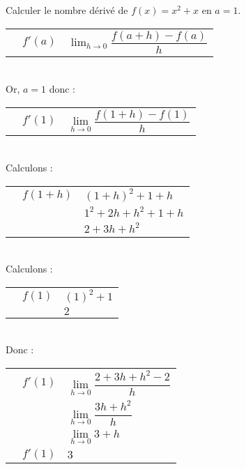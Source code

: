 \documentclass[11pt]{article}
\begin{document}
\begin{correction}[Exercice 1.1]
Calculer le nombre dérivé de $f(x)=x^2+x$ en $a=1$.\\
   \begin{tabular}{p{0.3cm}l!{=}l}
      &  $f'(a)$ & $\lim_{h\to0}\dfrac{f(a+h)-f(a)}{h}$ \\
   \end{tabular} \\

Or, $a=1$ donc :

   \begin{tabular}{p{0.3cm}l!{=}l}
      &  $f'(1)$ & $\lim\limits_{h\to0}\dfrac{f(1+h)-f(1)}{h}$ \\
   \end{tabular} \\

Calculons :\\
\begin{tabular}{p{0.3cm}l!{=}l}
      &  $f(1+h)$ & $(1+h)^2+1+h$\\
      &  & $1^2+2h+h^2+1+h$\\
      &  & $2+3h+h^2$\\
\end{tabular} \\


Calculons :\\
\begin{tabular}{p{0.3cm}l!{=}l}
      &  $f(1)$ & $(1)^2+1$\\
      &  & $2$\\
\end{tabular} \\

Donc :

   \begin{tabular}{p{0.3cm}l!{=}l}
      &  $f'(1)$ & $\lim\limits_{h\to0}\dfrac{2+3h+h^2-2}{h}$ \\
      &   & $\lim\limits_{h\to0}\dfrac{3h+h^2}{h}$ \\
      &   & $\lim\limits_{h\to0}3+h$ \\
      &  $f'(1)$ & $3$ \\
   \end{tabular} \\

\end{correction}

\newpage

\begin{exercice}
  
\end{exercice}
\end{document}

